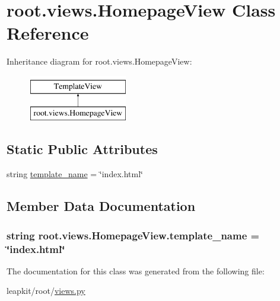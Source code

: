 \hypertarget{classroot_1_1views_1_1_homepage_view}{\section{root.\-views.\-Homepage\-View Class Reference}
\label{classroot_1_1views_1_1_homepage_view}
}
Inheritance diagram for root.\-views.\-Homepage\-View\-:\begin{figure}[H]
\begin{center}
\leavevmode
\includegraphics[height=2.000000cm]{classroot_1_1views_1_1_homepage_view}
\end{center}
\end{figure}
\subsection*{Static Public Attributes}
\begin{DoxyCompactItemize}
\item 
string \hyperlink{classroot_1_1views_1_1_homepage_view_ab3fbed2e4f4395386c6f5e61bcfc7930}{template\-\_\-name} = \char`\"{}index.\-html\char`\"{}
\end{DoxyCompactItemize}


\subsection{Member Data Documentation}
\hypertarget{classroot_1_1views_1_1_homepage_view_ab3fbed2e4f4395386c6f5e61bcfc7930}{
\subsubsection[{template\-\_\-name}]{\setlength{\rightskip}{0pt plus 5cm}string root.\-views.\-Homepage\-View.\-template\-\_\-name = \char`\"{}index.\-html\char`\"{}\hspace{0.3cm}{\ttfamily [static]}}}\label{classroot_1_1views_1_1_homepage_view_ab3fbed2e4f4395386c6f5e61bcfc7930}


The documentation for this class was generated from the following file\-:\begin{DoxyCompactItemize}
\item 
leapkit/root/\hyperlink{root_2views_8py}{views.\-py}\end{DoxyCompactItemize}

